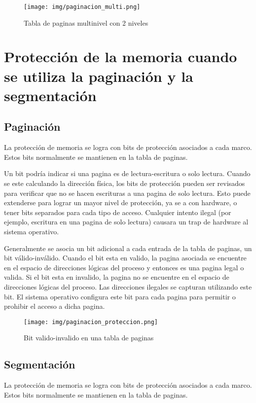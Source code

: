\documentclass{article}
\begin{document}
\begin{figure}[H]
	\centering
	\texttt{[image: img/paginacion\_multi.png]}
	\caption{Tabla de paginas multinivel con 2 niveles}
\end{figure}


{\centering \section*{Protección de la memoria cuando se utiliza la paginación y la segmentación}}

\subsection*{Paginación}
La protección de memoria se logra con bits de protección asociados a cada marco. Estos bits normalmente se mantienen en la tabla de paginas.

Un bit podría indicar si una pagina es de lectura-escritura o solo lectura. Cuando se este calculando la dirección física, los bits de protección pueden ser revisados para verificar que no se hacen escrituras a una pagina de solo lectura. Esto puede extenderse para lograr un mayor nivel de protección, ya se a con hardware, o tener bits separados para cada tipo de acceso. Cualquier intento ilegal (por ejemplo, escritura en una pagina de solo lectura) causara un trap de hardware al sistema operativo.

Generalmente se asocia un bit adicional a cada entrada de la tabla de paginas, un bit válido-inválido. Cuando el bit esta en valido, la pagina asociada se encuentre en el espacio de direcciones lógicas del proceso y entonces es una pagina legal o valida. Si el bit esta en invalido, la pagina no se encuentre en el espacio de direcciones lógicas del proceso. Las direcciones ilegales se capturan utilizando este bit. El sistema operativo configura este bit para cada pagina para permitir o prohibir el acceso a dicha pagina.

\begin{figure}[H]
	\centering
	\texttt{[image: img/paginacion\_proteccion.png]}
	\caption{Bit valido-invalido en una tabla de paginas}
\end{figure}

\subsection*{Segmentación}
La protección de memoria se logra con bits de protección asociados a cada marco. Estos bits normalmente se mantienen en la tabla de paginas.
\end{document}
